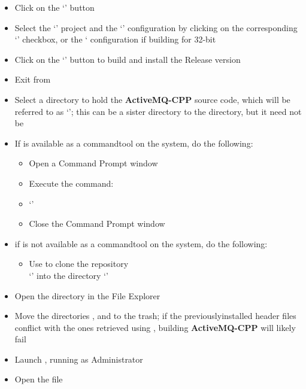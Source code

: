 \begin{itemize}
\item\exSp{}Click on the `' button
\item\exSp{}Select the `' project and the `'
configuration by clicking on the corresponding `' checkbox, or the
` configuration if building for 32-bit
\item\exSp{}Click on the `' button to build and install the Release
version
\item\exSp{}Exit from 
\item\exSp{}Select a directory to hold the \textbf{ActiveMQ-CPP} source code, which will
be referred to as `'; this can be a sister directory to the
 directory, but it need not be
\item\exSp{}If  is available as a command\longDash{}tool on the system, do the
following:
\begin{itemize}
\item Open a Command Prompt window
\item\exSp{}Execute the command:
\item `'
\item\exSp{}Close the Command Prompt window
\end{itemize}
\item\exSp{}if  is not available as a command\longDash{}tool on the system, do
the following:
\begin{itemize}
\item Use  to clone the repository\\
`' into the directory
`'
\end{itemize}
\item\exSp{}Open the directory  in the File Explorer
\item\exSp{}Move the directories ,  and  to the
trash;
if the previously\longDash{}installed header files conflict with the ones retrieved using
, building \textbf{ActiveMQ-CPP} will likely fail
\item\exSp{}Launch , running as Administrator
\item\exSp{}Open the file

\end{itemize}
